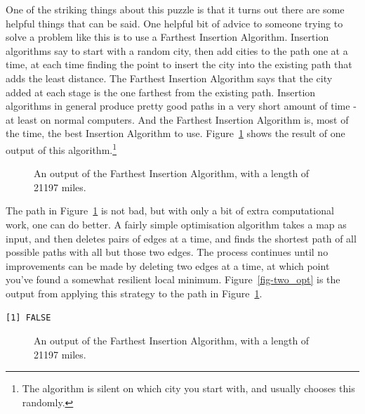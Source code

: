\documentclass[
  letterpaper,
  DIV=11,
  numbers=noendperiod]{scrartcl}
\begin{document}
One of the striking things about this puzzle is that it turns out there
are some helpful things that can be said. One helpful bit of advice to
someone trying to solve a problem like this is to use a Farthest
Insertion Algorithm. Insertion algorithms say to start with a random
city, then add cities to the path one at a time, at each time finding
the point to insert the city into the existing path that adds the least
distance. The Farthest Insertion Algorithm says that the city added at
each stage is the one farthest from the existing path. Insertion
algorithms in general produce pretty good paths in a very short amount
of time - at least on normal computers. And the Farthest Insertion
Algorithm is, most of the time, the best Insertion Algorithm to use.
Figure~\ref{fig-farthest} shows the result of one output of this
algorithm.\footnote{The algorithm is silent on which city you start
  with, and usually chooses this randomly.}

\begin{figure}


\caption{\label{fig-farthest}An output of the Farthest Insertion
Algorithm, with a length of 21197 miles.}

\end{figure}%

The path in Figure~\ref{fig-farthest} is not bad, but with only a bit of
extra computational work, one can do better. A fairly simple
optimisation algorithm takes a map as input, and then deletes pairs of
edges at a time, and finds the shortest path of all possible paths with
all but those two edges. The process continues until no improvements can
be made by deleting two edges at a time, at which point you've found a
somewhat resilient local minimum. Figure~\ref{fig-two_opt} is the output
from applying this strategy to the path in Figure~\ref{fig-farthest}.

\begin{verbatim}
[1] FALSE
\end{verbatim}

\begin{figure}


\caption{\label{fig-two\_opt}An output of the Farthest Insertion
Algorithm, with a length of 21197 miles.}

\end{figure}%
\end{document}

